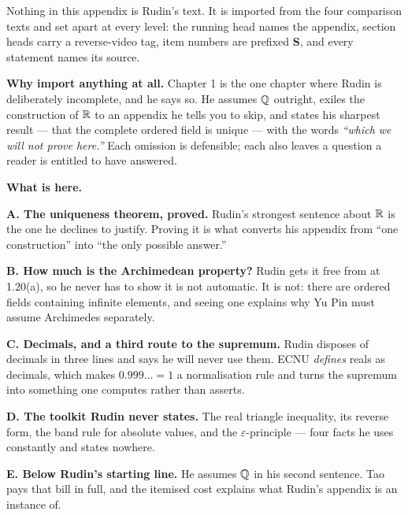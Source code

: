 
\begin{roadmap}
Nothing in this appendix is Rudin's text. It is imported from the four
comparison texts and set apart at every level: the running head names the
appendix, section heads carry a reverse-video tag, item numbers are prefixed
\textbf{S}, and every statement names its source.

\medskip
\raggedright
\textbf{Why import anything at all.} Chapter 1 is the one chapter where Rudin
is deliberately incomplete, and he says so. He assumes $\mathbb{Q}$ outright, exiles
the construction of $\mathbb{R}$ to an appendix he tells you to skip, and states his
sharpest result --- that the complete ordered field is unique --- with the
words \emph{``which we will not prove here.''} Each omission is defensible;
each also leaves a question a reader is entitled to have answered.

\medskip
\textbf{What is here.}

\smallskip
\textbf{A. The uniqueness theorem, proved.} Rudin's strongest sentence about
$\mathbb{R}$ is the one he declines to justify. Proving it is what converts his
appendix from ``one construction'' into ``the only possible answer.''

\medskip
\textbf{B. How much is the Archimedean property?} Rudin gets it free from
\lub{} at 1.20(a), so he never has to show it is not automatic. It is not:
there are ordered fields containing infinite elements, and seeing one
explains why Yu Pin must assume Archimedes separately.

\medskip
\textbf{C. Decimals, and a third route to the supremum.} Rudin disposes of
decimals in three lines and says he will never use them. ECNU \emph{defines}
reals as decimals, which makes $0.999\ldots = 1$ a normalisation rule and
turns the supremum into something one computes rather than asserts.

\medskip
\textbf{D. The toolkit Rudin never states.} The real triangle inequality, its
reverse form, the band rule for absolute values, and the
$\varepsilon$-principle --- four facts he uses constantly and states
nowhere.

\medskip
\textbf{E. Below Rudin's starting line.} He assumes $\mathbb{Q}$ in his second
sentence. Tao pays that bill in full, and the itemised cost explains what
Rudin's appendix is an instance of.


\end{roadmap}
